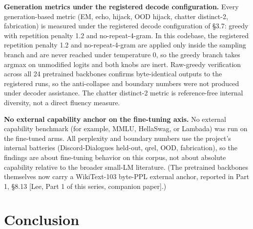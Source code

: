 \documentclass[11pt]{article}
\begin{document}
\textbf{Generation metrics under the registered decode configuration.} Every generation-based metric (EM, echo, hijack, OOD hijack, chatter distinct-2, fabrication) is measured under the registered decode configuration of \S3.7: greedy with repetition penalty 1.2 and no-repeat-4-gram. In this codebase, the registered repetition penalty 1.2 and no-repeat-4-gram are applied only inside the sampling branch and are never reached under temperature 0, so the greedy branch takes argmax on unmodified logits and both knobs are inert. Raw-greedy verification across all 24 pretrained backbones confirms byte-identical outputs to the registered runs, so the anti-collapse and boundary numbers were not produced under decoder assistance. The chatter distinct-2 metric is reference-free internal diversity, not a direct fluency measure.

\textbf{No external capability anchor on the fine-tuning axis.} No external capability benchmark (for example, MMLU, HellaSwag, or Lambada) was run on the fine-tuned arms. All perplexity and boundary numbers use the project's internal batteries (Discord-Dialogues held-out, qrel, OOD, fabrication), so the findings are about fine-tuning behavior on this corpus, not about absolute capability relative to the broader small-LM literature. (The pretrained backbones themselves now carry a WikiText-103 byte-PPL external anchor, reported in Part 1, \S8.13 [Lee, Part 1 of this series, companion paper].)

\section{Conclusion}
\end{document}
